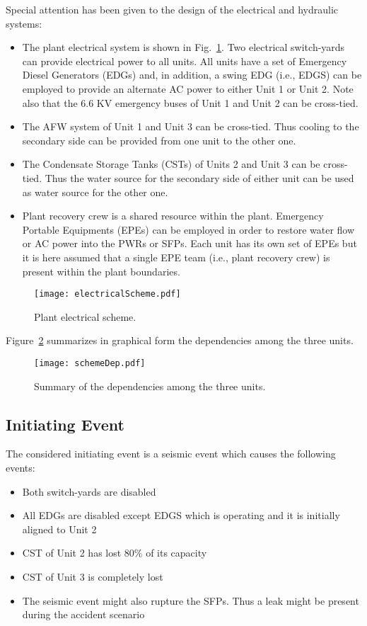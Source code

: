 Special attention has been given to the design of the electrical and hydraulic systems:
\begin{itemize}
  \item The plant electrical system is shown in Fig.~\ref{fig:electricalScheme}. Two 
        electrical switch-yards can provide electrical power to all units. All units 
        have a set of Emergency Diesel Generators (EDGs)  and, in addition, a swing 
        EDG (i.e., EDGS) can be employed to provide an alternate AC power to either
        Unit 1 or Unit 2. Note also that the 6.6 KV emergency buses of Unit 1 and 
        Unit 2 can be cross-tied.
  \item The AFW system of Unit 1 and Unit 3 can be cross-tied. 
        Thus cooling to the secondary side can be provided from one unit to the other one.
  \item The Condensate Storage Tanks (CSTs) of Units 2 and Unit 3 can be cross-tied. 
        Thus the water source  for the secondary side of either unit can be used as
        water source for the other one. 
  \item Plant recovery crew is a shared resource within the plant. Emergency Portable Equipments 
        (EPEs) can be employed in order
        to restore water flow or AC power into the PWRs or SFPs. Each unit has its own 
        set of EPEs but it is here assumed that a single EPE team (i.e., plant recovery 
        crew) is present within the plant boundaries.
\end{itemize}

\begin{figure}
    \centering
    \centerline{\texttt{[image: electricalScheme.pdf]}}
    \caption{Plant electrical scheme.}
    \label{fig:electricalScheme}
\end{figure}

Figure~\ref{fig:schemeDep} summarizes in graphical form the dependencies among the three units.

\begin{figure}
    \centering
    \centerline{\texttt{[image: schemeDep.pdf]}}
    \caption{Summary of the dependencies among the three units.}
    \label{fig:schemeDep}
\end{figure}

\subsection{Initiating Event}

The considered initiating event is a seismic event which causes the following events:
\begin{itemize}
  \item Both switch-yards are disabled
  \item All EDGs are disabled except EDGS which is operating and it is initially aligned to Unit 2
  \item CST of Unit 2 has lost 80\% of its capacity 
  \item CST of Unit 3 is completely lost
  \item The seismic event might also rupture the SFPs. Thus a leak might be present during the accident scenario
\end{itemize}


